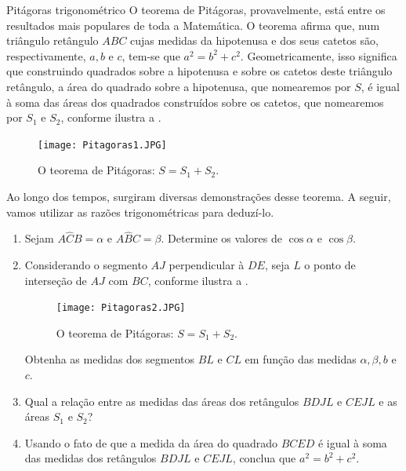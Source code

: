 \begin{task}{Pitágoras trigonométrico}
O teorema de Pitágoras, provavelmente, está entre os resultados mais populares de toda a Matemática. O teorema afirma que, num triângulo retângulo $ABC$ cujas medidas da hipotenusa e dos seus catetos são, respectivamente, $a, b$ e $c$, tem-se que $a^2=b^2+c^2$. Geometricamente, isso significa que construindo quadrados sobre a hipotenusa e sobre os catetos deste triângulo retângulo, a área do quadrado sobre a hipotenusa, que nomearemos por $S$, é igual à soma das áreas dos quadrados construídos sobre os catetos, que nomearemos por $S_1$ e $S_2$, conforme ilustra a .
\begin{figure}[H]
    \centering
    \texttt{[image: Pitagoras1.JPG]}
    \caption{O teorema de Pitágoras: $S=S_1+S_2$.}
    \label{Pitagoras1}
\end{figure}
Ao longo dos tempos, surgiram diversas demonstrações desse teorema. A seguir, vamos utilizar as  razões trigonométricas para deduzí-lo.

\begin{enumerate}
    \item{}
    Sejam $A\hat{C}B=\alpha$ e $A\hat{B}C=\beta$. Determine os valores de $\cos \alpha$ e $\cos \beta$.
    
    \item{}
    Considerando o segmento $AJ$ perpendicular à $DE$, seja $L$ o ponto de interseção de $AJ$ com $BC$, conforme ilustra a .
    \begin{figure}[H]
    \centering
    \texttt{[image: Pitagoras2.JPG]}
    \caption{O teorema de Pitágoras: $S=S_1+S_2$.}
    \label{Pitagoras1.1}
\end{figure}
    Obtenha as medidas dos segmentos $BL$ e $CL$ em função das medidas $\alpha, \beta, b$ e $c$.
    
    \item{}
    Qual a relação entre as medidas das áreas dos retângulos $BDJL$ e $CEJL$ e as áreas $S_1$ e $S_2$?
    \item{}
    Usando o fato de que a medida da área do quadrado $BCED$ é igual à soma das medidas dos retângulos $BDJL$ e $CEJL$, conclua que $a^2=b^2+c^2$.
\end{enumerate}
\end{task}

